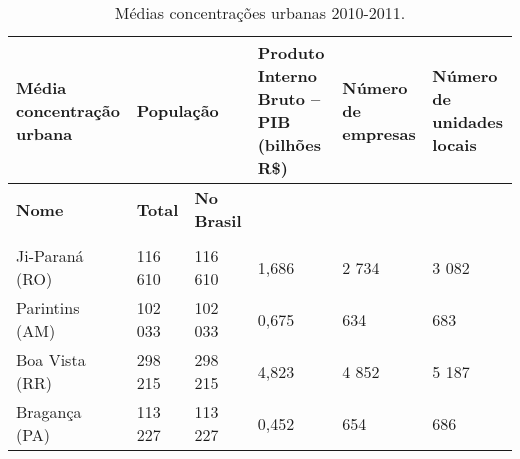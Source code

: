 \begin{table}[htb]
	\ABNTEXfontereduzida
	\caption{\label{tab:Tab_1}Médias concentrações urbanas 2010-2011.}
	\begin{tabular}{@{}p{3.0cm}p{1.5cm}p{2cm}p{2.5cm}p{2.5cm}p{2.5cm}@{}}
		\toprule
		\textbf{Média concentração urbana} & \multicolumn{2}{l}{\textbf{População}} & \textbf{Produto Interno Bruto – PIB (bilhões R\$)} & \textbf{Número de empresas} & \textbf{Número de unidades locais} \\ \midrule
		\textbf{Nome}                      & \textbf{Total}   & \textbf{No Brasil}  &                                                   &                             & \\
		                      &    &    &                                                   &                             & \\
		Ji-Paraná (RO)                     & 116 610          & 116 610             & 1,686                                             & 2 734                       & 3 082 \\
		Parintins (AM)                     & 102 033          & 102 033             & 0,675                                             & 634                         & 683 \\
		Boa Vista (RR)                     & 298 215          & 298 215             & 4,823                                             & 4 852                       & 5 187 \\
		Bragança (PA)                      & 113 227          & 113 227             & 0,452                                             & 654                         & 686 \\ \bottomrule
	\end{tabular}
\end{table}